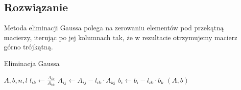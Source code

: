 \documentclass[11pt]{article}
\begin{document}
    \subsection*{Rozwiązanie}
        Metoda eliminacji Gaussa polega na zerowaniu elementów pod przekątną macierzy, iterując po jej kolumnach tak, że w rezultacie otrzymujemy macierz górno trójkątną.

        \begin{algorithm}[h!]
        \caption{Eliminacja Gaussa}
        \label{alg:gauss_elimination_default}
        \begin{algorithmic}[1]
            \Require $A, b, n, l$
                    \State $l_{ik} \gets \frac{A_{ik}}{A_{kk}}$
                        \State $A_{ij} \gets A_{ij} - l_{ik} \cdot A_{kj}$
                    \EndFor
                    \State $b_i \gets b_i - l_{ik} \cdot b_k$
                \EndFor
            \EndFor
            \State \Return $(A, b)$
        \end{algorithmic}
        \end{algorithm}
\end{document}
